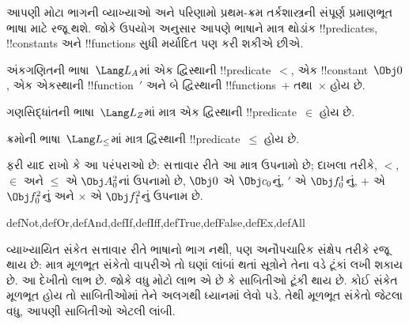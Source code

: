 \documentclass[../../../include/open-logic-section]{subfiles}
\begin{document}
આપણી મોટા ભાગની વ્યાખ્યાઓ અને પરિણામો પ્રથમ-ક્રમ તર્કશાસ્ત્રની
સંપૂર્ણ પ્રમાણભૂત ભાષા માટે રજૂ થશે. જોકે ઉપયોગ અનુસાર આપણે ભાષાને
માત્ર થોડાંક !!{predicate}s, !!{constant}s અને !!{function}s સુધી
મર્યાદિત પણ કરી શકીએ છીએ.

\begin{ex}
અંકગણિતની ભાષા~$\Lang L_A$માં એક દ્વિસ્થાની !!{predicate}~$<$, એક
!!{constant}~$\Obj 0$, એક એકસ્થાની !!{function}~$\prime$ અને બે
દ્વિસ્થાની !!{function}s~$+$ તથા~$\times$ હોય છે.
\end{ex}

\begin{ex}
ગણસિદ્ધાંતની ભાષા~$\Lang L_Z$માં માત્ર એક દ્વિસ્થાની
!!{predicate}~$\in$ હોય છે.
\end{ex}

\begin{ex}
ક્રમોની ભાષા~$\Lang L_\le$માં માત્ર દ્વિસ્થાની
!!{predicate}~$\le$ હોય છે.
\end{ex}

ફરી યાદ રાખો કે આ પરંપરાઓ છે: સત્તાવાર રીતે આ માત્ર ઉપનામો છે;
દાખલા તરીકે, $<$, $\in$ અને $\le$ એ $\Obj A^2_0$નાં ઉપનામો છે,
$\Obj 0$ એ $\Obj c_0$નું, $\prime$ એ $\Obj f^1_0$નું, $+$ એ
$\Obj f^2_0$નું અને $\times$ એ $\Obj f^2_1$નું ઉપનામ છે.


\begin{tagblock}{defNot,defOr,defAnd,defIf,defIff,defTrue,defFalse,defEx,defAll}
\begin{explain}
વ્યાખ્યાયિત સંકેત સત્તાવાર રીતે ભાષાનો ભાગ નથી, પણ અનૌપચારિક
સંક્ષેપ તરીકે રજૂ થાય છે: માત્ર મૂળભૂત સંકેતો વાપરીએ તો ઘણાં લાંબાં
થતાં સૂત્રોને તેના વડે ટૂંકાં લખી શકાય છે. આ દેખીતો લાભ છે. જોકે વધુ
મોટો લાભ એ છે કે સાબિતીઓ ટૂંકી થાય છે. કોઈ સંકેત મૂળભૂત હોય તો
સાબિતીઓમાં તેને અલગથી ધ્યાનમાં લેવો પડે. તેથી મૂળભૂત સંકેતો જેટલા
વધુ, આપણી સાબિતીઓ એટલી લાંબી.
\end{explain}
\end{tagblock}
\end{document}

